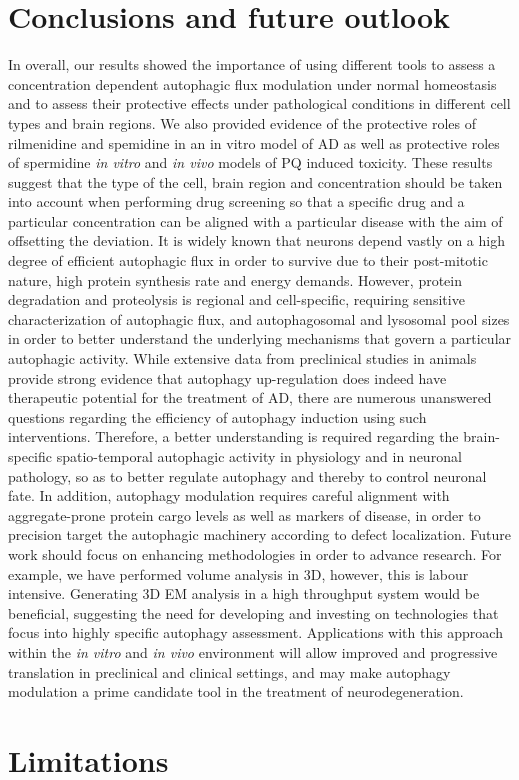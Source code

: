 \section{Conclusions and future outlook}
In overall, our results showed the importance of using different tools to assess a concentration dependent autophagic flux modulation under normal homeostasis and to assess their protective effects under pathological conditions in different cell types and brain regions. We also provided evidence of the protective roles of rilmenidine and spemidine in an in vitro model of AD as well as protective roles of spermidine \textit{in vitro} and \textit{in vivo} models of PQ induced toxicity. These results suggest that the type of the cell, brain region and concentration should be taken into account when performing drug screening so that a specific drug and a particular concentration can be aligned with a particular disease with the aim of offsetting the deviation. It is widely known that neurons depend vastly on a high degree of efficient autophagic flux in order to survive due to their post-mitotic nature, high protein synthesis rate and energy demands. However, protein degradation and proteolysis is regional and cell-specific, requiring sensitive characterization of autophagic flux, and autophagosomal and lysosomal pool sizes in order to better understand the underlying mechanisms that govern a particular autophagic activity. While extensive data from preclinical studies in animals provide strong evidence that autophagy up-regulation does indeed have therapeutic potential for the treatment of AD, there are numerous unanswered questions regarding the efficiency of autophagy induction using such interventions. Therefore, a better understanding is required regarding the brain-specific spatio-temporal autophagic activity in physiology and in neuronal pathology, so as to better regulate autophagy and thereby to control neuronal fate. In addition, autophagy modulation requires careful alignment with aggregate-prone protein cargo levels as well as markers of disease, in order to precision target the autophagic machinery according to defect localization. Future work should focus on enhancing methodologies in order to advance research. For example, we have performed volume analysis in 3D, however, this is labour intensive. Generating 3D EM analysis in a high throughput system would be beneficial, suggesting the need for developing and investing on technologies that focus into highly specific autophagy assessment. Applications with this approach within the \textit{in vitro} and \textit{in vivo} environment will allow improved and progressive translation in preclinical and clinical settings, and may make autophagy modulation a prime candidate tool in the treatment of neurodegeneration. 

\section{Limitations}
